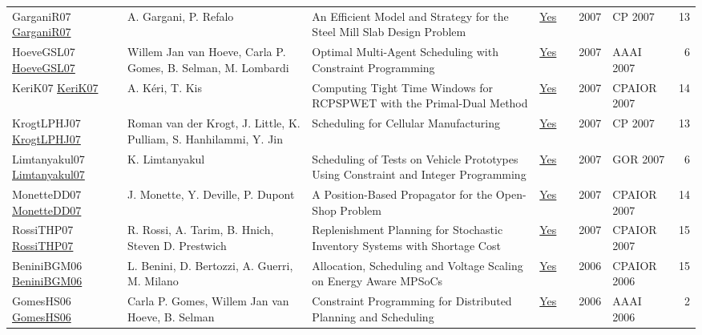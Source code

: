 {\begin{longtable}{p{3cm}p{6cm}p{7cm}rrrp{3cm}r}
GarganiR07 \href{https://doi.org/10.1007/978-3-540-74970-7\_8}{GarganiR07} & A. Gargani, P. Refalo & An Efficient Model and Strategy for the Steel Mill Slab Design Problem & \href{papers/GarganiR07.pdf}{Yes} & \cite{GarganiR07} & 2007 & CP 2007 & 13\\
HoeveGSL07 \href{http://www.aaai.org/Library/AAAI/2007/aaai07-291.php}{HoeveGSL07} & Willem Jan van Hoeve, Carla P. Gomes, B. Selman, M. Lombardi & Optimal Multi-Agent Scheduling with Constraint Programming & \href{papers/HoeveGSL07.pdf}{Yes} & \cite{HoeveGSL07} & 2007 & AAAI 2007 & 6\\
KeriK07 \href{https://doi.org/10.1007/978-3-540-72397-4\_10}{KeriK07} & A. K{\'{e}}ri, T. Kis & Computing Tight Time Windows for {RCPSPWET} with the Primal-Dual Method & \href{papers/KeriK07.pdf}{Yes} & \cite{KeriK07} & 2007 & CPAIOR 2007 & 14\\
KrogtLPHJ07 \href{https://doi.org/10.1007/978-3-540-74970-7\_10}{KrogtLPHJ07} & Roman van der Krogt, J. Little, K. Pulliam, S. Hanhilammi, Y. Jin & Scheduling for Cellular Manufacturing & \href{papers/KrogtLPHJ07.pdf}{Yes} & \cite{KrogtLPHJ07} & 2007 & CP 2007 & 13\\
Limtanyakul07 \href{https://doi.org/10.1007/978-3-540-77903-2\_65}{Limtanyakul07} & K. Limtanyakul & Scheduling of Tests on Vehicle Prototypes Using Constraint and Integer Programming & \href{papers/Limtanyakul07.pdf}{Yes} & \cite{Limtanyakul07} & 2007 & GOR 2007 & 6\\
MonetteDD07 \href{https://doi.org/10.1007/978-3-540-72397-4\_14}{MonetteDD07} & J. Monette, Y. Deville, P. Dupont & A Position-Based Propagator for the Open-Shop Problem & \href{papers/MonetteDD07.pdf}{Yes} & \cite{MonetteDD07} & 2007 & CPAIOR 2007 & 14\\
RossiTHP07 \href{https://doi.org/10.1007/978-3-540-72397-4\_17}{RossiTHP07} & R. Rossi, A. Tarim, B. Hnich, Steven D. Prestwich & Replenishment Planning for Stochastic Inventory Systems with Shortage Cost & \href{papers/RossiTHP07.pdf}{Yes} & \cite{RossiTHP07} & 2007 & CPAIOR 2007 & 15\\
BeniniBGM06 \href{https://doi.org/10.1007/11757375\_6}{BeniniBGM06} & L. Benini, D. Bertozzi, A. Guerri, M. Milano & Allocation, Scheduling and Voltage Scaling on Energy Aware MPSoCs & \href{papers/BeniniBGM06.pdf}{Yes} & \cite{BeniniBGM06} & 2006 & CPAIOR 2006 & 15\\
GomesHS06 \href{http://www.aaai.org/Library/Symposia/Spring/2006/ss06-04-024.php}{GomesHS06} & Carla P. Gomes, Willem Jan van Hoeve, B. Selman & Constraint Programming for Distributed Planning and Scheduling & \href{papers/GomesHS06.pdf}{Yes} & \cite{GomesHS06} & 2006 & AAAI 2006 & 2\\

\end{longtable}}

